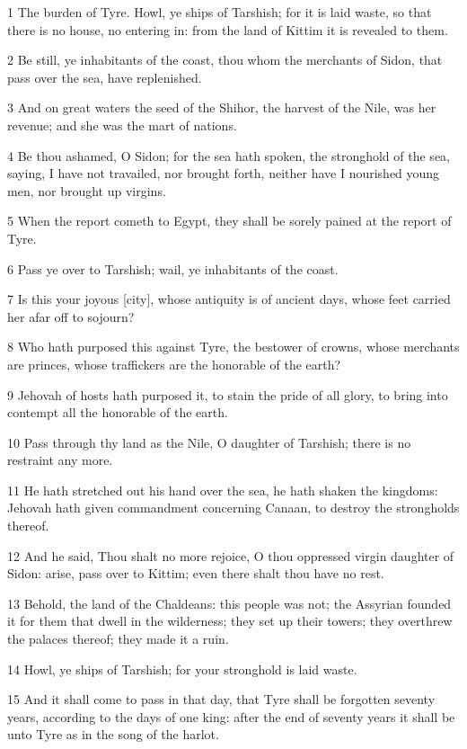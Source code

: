 \par 1 The burden of Tyre. Howl, ye ships of Tarshish; for it is laid waste, so that there is no house, no entering in: from the land of Kittim it is revealed to them.
\par 2 Be still, ye inhabitants of the coast, thou whom the merchants of Sidon, that pass over the sea, have replenished.
\par 3 And on great waters the seed of the Shihor, the harvest of the Nile, was her revenue; and she was the mart of nations.
\par 4 Be thou ashamed, O Sidon; for the sea hath spoken, the stronghold of the sea, saying, I have not travailed, nor brought forth, neither have I nourished young men, nor brought up virgins.
\par 5 When the report cometh to Egypt, they shall be sorely pained at the report of Tyre.
\par 6 Pass ye over to Tarshish; wail, ye inhabitants of the coast.
\par 7 Is this your joyous [city], whose antiquity is of ancient days, whose feet carried her afar off to sojourn?
\par 8 Who hath purposed this against Tyre, the bestower of crowns, whose merchants are princes, whose traffickers are the honorable of the earth?
\par 9 Jehovah of hosts hath purposed it, to stain the pride of all glory, to bring into contempt all the honorable of the earth.
\par 10 Pass through thy land as the Nile, O daughter of Tarshish; there is no restraint any more.
\par 11 He hath stretched out his hand over the sea, he hath shaken the kingdoms: Jehovah hath given commandment concerning Canaan, to destroy the strongholds thereof.
\par 12 And he said, Thou shalt no more rejoice, O thou oppressed virgin daughter of Sidon: arise, pass over to Kittim; even there shalt thou have no rest.
\par 13 Behold, the land of the Chaldeans: this people was not; the Assyrian founded it for them that dwell in the wilderness; they set up their towers; they overthrew the palaces thereof; they made it a ruin.
\par 14 Howl, ye ships of Tarshish; for your stronghold is laid waste.
\par 15 And it shall come to pass in that day, that Tyre shall be forgotten seventy years, according to the days of one king: after the end of seventy years it shall be unto Tyre as in the song of the harlot.
